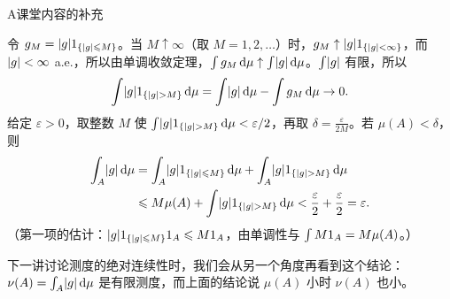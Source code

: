 \begin{exercises}{A}{课堂内容的补充}
\begin{solution}
令 $g_M=\lvert g\rvert1_{\{\lvert g\rvert\leqslant M\}}$。当 $M\uparrow\infty$（取 $M=1,2,\dots$）时，$g_M\uparrow\lvert g\rvert1_{\{\lvert g\rvert<\infty\}}$，而 $\lvert g\rvert<\infty$ a.e.，所以由单调收敛定理，$\int g_M\,\mathrm{d}\mu\uparrow\int\lvert g\rvert\,\mathrm{d}\mu$。$\int\lvert g\rvert$ 有限，所以
\[
\int\lvert g\rvert1_{\{\lvert g\rvert>M\}}\,\mathrm{d}\mu=\int\lvert g\rvert\,\mathrm{d}\mu-\int g_M\,\mathrm{d}\mu\to0 .
\]
给定 $\varepsilon>0$，取整数 $M$ 使 $\int\lvert g\rvert1_{\{\lvert g\rvert>M\}}\,\mathrm{d}\mu<\varepsilon/2$，再取 $\delta=\frac\varepsilon{2M}$。若 $\mu(A)<\delta$，则
\[
\begin{aligned}
\int_A\lvert g\rvert\,\mathrm{d}\mu&=\int_A\lvert g\rvert1_{\{\lvert g\rvert\leqslant M\}}\,\mathrm{d}\mu+\int_A\lvert g\rvert1_{\{\lvert g\rvert>M\}}\,\mathrm{d}\mu\\
&\leqslant M\mu(A)+\int\lvert g\rvert1_{\{\lvert g\rvert>M\}}\,\mathrm{d}\mu<\frac\varepsilon2+\frac\varepsilon2=\varepsilon .
\end{aligned}
\]
（第一项的估计：$\lvert g\rvert1_{\{\lvert g\rvert\leqslant M\}}1_A\leqslant M1_A$，由单调性与 $\int M1_A=M\mu(A)$。）

下一讲讨论测度的绝对连续性时，我们会从另一个角度再看到这个结论：$\nu(A)=\int_A\lvert g\rvert\,\mathrm{d}\mu$ 是有限测度，而上面的结论说 $\mu(A)$ 小时 $\nu(A)$ 也小。
\end{solution}
\end{exercises}


